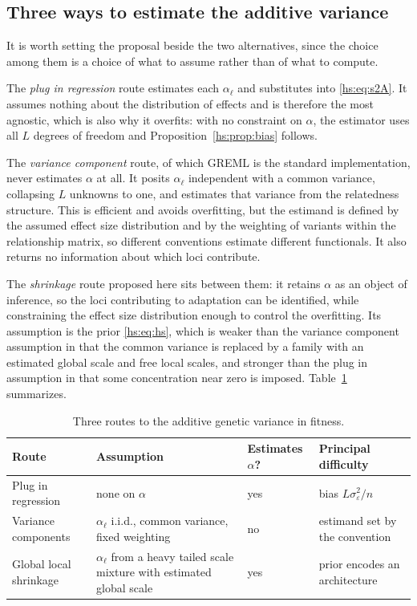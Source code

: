 \subsection{Three ways to estimate the additive variance}

It is worth setting the proposal beside the two alternatives, since the choice among them is a choice of what to assume rather than of what to compute.

The \emph{plug in regression} route estimates each $\alpha_\ell$ and substitutes into \eqref{hs:eq:s2A}. It assumes nothing about the distribution of effects and is therefore the most agnostic, which is also why it overfits: with no constraint on $\alpha$, the estimator uses all $L$ degrees of freedom and Proposition~\ref{hs:prop:bias} follows.

The \emph{variance component} route, of which GREML \citep{hs:yang2011gcta} is the standard implementation, never estimates $\alpha$ at all. It posits $\alpha_\ell$ independent with a common variance, collapsing $L$ unknowns to one, and estimates that variance from the relatedness structure. This is efficient and avoids overfitting, but the estimand is defined by the assumed effect size distribution and by the weighting of variants within the relationship matrix, so different conventions estimate different functionals. It also returns no information about which loci contribute.

The \emph{shrinkage} route proposed here sits between them: it retains $\alpha$ as an object of inference, so the loci contributing to adaptation can be identified, while constraining the effect size distribution enough to control the overfitting. Its assumption is the prior \eqref{hs:eq:hs}, which is weaker than the variance component assumption in that the common variance is replaced by a family with an estimated global scale and free local scales, and stronger than the plug in assumption in that some concentration near zero is imposed. Table~\ref{hs:tab:three} summarizes.

\begin{table}[t]
\centering
\small
\begin{tabularx}{\textwidth}{>{\raggedright\arraybackslash}p{0.9in}>{\raggedright\arraybackslash}X>{\raggedright\arraybackslash}p{0.75in}>{\raggedright\arraybackslash}X}
\toprule
Route & Assumption & Estimates $\alpha$? & Principal difficulty \\
\midrule
Plug in regression & none on $\alpha$ & yes & bias $L\sigma^2_\varepsilon/n$ \\
Variance components & $\alpha_\ell$ i.i.d., common variance, fixed weighting & no & estimand set by the convention \\
Global local shrinkage & $\alpha_\ell$ from a heavy tailed scale mixture with estimated global scale & yes & prior encodes an architecture \\
\bottomrule
\end{tabularx}
\caption{Three routes to the additive genetic variance in fitness.}
\label{hs:tab:three}
\end{table}

